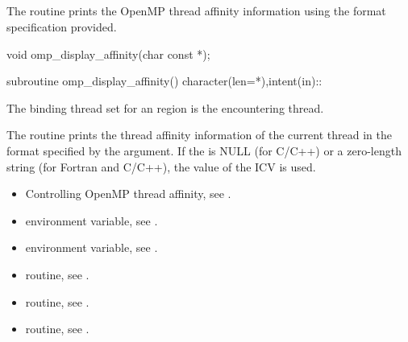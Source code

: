 \subsection{}
\label{subsec:omp_display_affinity}

\summary
The  routine prints the OpenMP thread affinity information using the format specification provided.

\format
\begin{ccppspecific}
\begin{ompcFunction}
void omp_display_affinity(char const *);
\end{ompcFunction}
\end{ccppspecific}

\newpage %
\begin{fortranspecific}
\begin{ompfSubroutine}
subroutine omp_display_affinity()
character(len=*),intent(in)::
\end{ompfSubroutine}
\end{fortranspecific}

\binding
The binding thread set for an  region is the encountering thread.

\effect
The  routine prints the thread affinity information of the current thread in the format
specified by the  argument. If the  is NULL (for C/C++) or a zero-length string
(for Fortran and C/C++), the value of the  ICV is used.

\crossreferences
\begin{itemize}
\item Controlling OpenMP thread affinity, see 
. 
\item {} environment variable, see 
.
\item {} environment variable, see 
.
\item {} routine, see .
\item {} routine, see .
\item {} routine, see .
\end{itemize}



